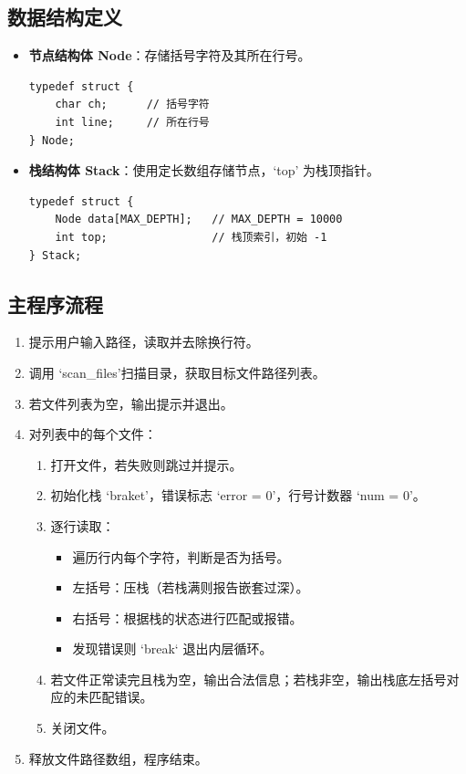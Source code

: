 \documentclass[UTF8]{ctexart}
\begin{document}
\subsection{数据结构定义}
\begin{itemize}
    \item \textbf{节点结构体 Node}：存储括号字符及其所在行号。
\begin{lstlisting}
typedef struct {
    char ch;      // 括号字符
    int line;     // 所在行号
} Node;
\end{lstlisting}
    \item \textbf{栈结构体 Stack}：使用定长数组存储节点，‘top’ 为栈顶指针。
\begin{lstlisting}
typedef struct {
    Node data[MAX_DEPTH];   // MAX_DEPTH = 10000
    int top;                // 栈顶索引，初始 -1
} Stack;
\end{lstlisting}
\end{itemize}

\subsection{主程序流程}
\begin{enumerate}
    \item 提示用户输入路径，读取并去除换行符。
    \item 调用 ‘scan\_files’扫描目录，获取目标文件路径列表。
    \item 若文件列表为空，输出提示并退出。
    \item 对列表中的每个文件：
        \begin{enumerate}
            \item 打开文件，若失败则跳过并提示。
            \item 初始化栈 ‘braket’，错误标志 ‘error = 0’，行号计数器 ‘num = 0’。
            \item 逐行读取：
                \begin{itemize}
                    \item 遍历行内每个字符，判断是否为括号。
                    \item 左括号：压栈（若栈满则报告嵌套过深）。
                    \item 右括号：根据栈的状态进行匹配或报错。
                    \item 发现错误则 ‘break‘ 退出内层循环。
                \end{itemize}
            \item 若文件正常读完且栈为空，输出合法信息；若栈非空，输出栈底左括号对应的未匹配错误。
            \item 关闭文件。
        \end{enumerate}
    \item 释放文件路径数组，程序结束。
\end{enumerate}
\end{document}
